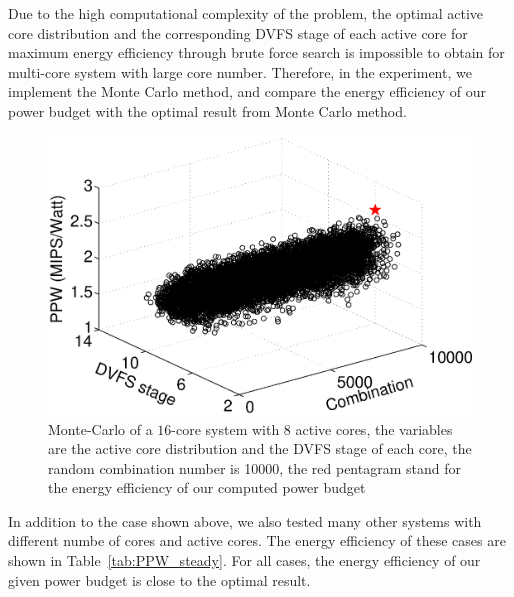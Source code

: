 Due to the high computational complexity of the problem, the optimal active core distribution and the corresponding DVFS stage of each active core for maximum energy efficiency through brute force search is impossible to obtain for multi-core system with large core number. Therefore, in the experiment, we implement the Monte Carlo method, and compare the energy efficiency of our power budget with the optimal result from Monte Carlo method. 
\begin{figure}
\centering
\includegraphics[width=0.8\linewidth]{fig/best_steady.eps}
\caption{Monte-Carlo of a $16$-core system with $8$ active cores, the variables are the active core distribution and the DVFS stage of each core, the random combination number is 10000, the red pentagram stand for the energy efficiency of our computed power budget}
\end{figure}





In addition to the case shown above, we also tested many other systems with different numbe of cores and active cores. The energy efficiency of these cases are shown in Table~\ref{tab:PPW_steady}. For all cases, the energy efficiency of our given power budget is close to the optimal result.





